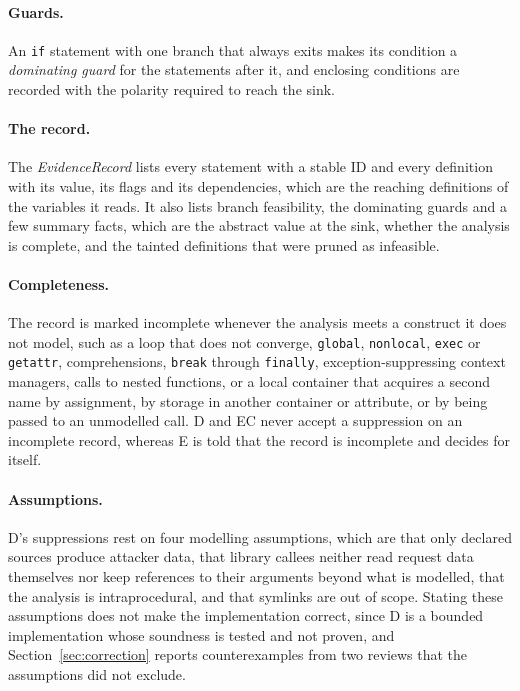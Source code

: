 \paragraph{Guards.}
An \texttt{if} statement with one branch that always exits makes its condition a \emph{dominating guard} for the statements after it, and enclosing conditions are recorded with the polarity required to reach the sink.

\paragraph{The record.}
The \emph{EvidenceRecord} lists every statement with a stable ID and every definition with its value, its flags and its dependencies, which are the reaching definitions of the variables it reads. It also lists branch feasibility, the dominating guards and a few summary facts, which are the abstract value at the sink, whether the analysis is complete, and the tainted definitions that were pruned as infeasible.

\paragraph{Completeness.}
The record is marked incomplete whenever the analysis meets a construct it does not model, such as a loop that does not converge, \texttt{global}, \texttt{nonlocal}, \texttt{exec} or \texttt{getattr}, comprehensions, \texttt{break} through \texttt{finally}, exception-suppressing context managers, calls to nested functions, or a local container that acquires a second name by assignment, by storage in another container or attribute, or by being passed to an unmodelled call. D and EC never accept a suppression on an incomplete record, whereas E is told that the record is incomplete and decides for itself.

\paragraph{Assumptions.}
D's suppressions rest on four modelling assumptions, which are that only declared sources produce attacker data, that library callees neither read request data themselves nor keep references to their arguments beyond what is modelled, that the analysis is intraprocedural, and that symlinks are out of scope. Stating these assumptions does not make the implementation correct, since D is a bounded implementation whose soundness is tested and not proven, and Section~\ref{sec:correction} reports counterexamples from two reviews that the assumptions did not exclude.

